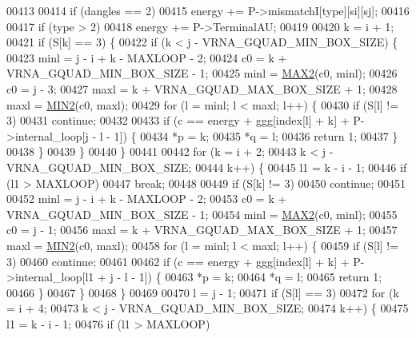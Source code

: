 \begin{DoxyCode}
00413 
00414   \textcolor{keywordflow}{if} (dangles == 2)
00415     energy += P->mismatchI[type][si][sj];
00416 
00417   \textcolor{keywordflow}{if} (type > 2)
00418     energy += P->TerminalAU;
00419 
00420   k = i + 1;
00421   \textcolor{keywordflow}{if} (S[k] == 3) \{
00422     \textcolor{keywordflow}{if} (k < j - VRNA\_GQUAD\_MIN\_BOX\_SIZE) \{
00423       minl  = j - i + k - MAXLOOP - 2;
00424       c0    = k + VRNA\_GQUAD\_MIN\_BOX\_SIZE - 1;
00425       minl  = \hyperlink{group__utils_ga33297b3679c713b0c4d897cd0fe3b122}{MAX2}(c0, minl);
00426       c0    = j - 3;
00427       maxl  = k + VRNA\_GQUAD\_MAX\_BOX\_SIZE + 1;
00428       maxl  = \hyperlink{group__utils_gae0b9cd0ce090bd69b951aa73e8fa4f7d}{MIN2}(c0, maxl);
00429       \textcolor{keywordflow}{for} (l = minl; l < maxl; l++) \{
00430         \textcolor{keywordflow}{if} (S[l] != 3)
00431           \textcolor{keywordflow}{continue};
00432 
00433         \textcolor{keywordflow}{if} (c == energy + ggg[index[l] + k] + P->internal\_loop[j - l - 1]) \{
00434           *p  = k;
00435           *q  = l;
00436           \textcolor{keywordflow}{return} 1;
00437         \}
00438       \}
00439     \}
00440   \}
00441 
00442   \textcolor{keywordflow}{for} (k = i + 2;
00443        k < j - VRNA\_GQUAD\_MIN\_BOX\_SIZE;
00444        k++) \{
00445     l1 = k - i - 1;
00446     \textcolor{keywordflow}{if} (l1 > MAXLOOP)
00447       \textcolor{keywordflow}{break};
00448 
00449     \textcolor{keywordflow}{if} (S[k] != 3)
00450       \textcolor{keywordflow}{continue};
00451 
00452     minl  = j - i + k - MAXLOOP - 2;
00453     c0    = k + VRNA\_GQUAD\_MIN\_BOX\_SIZE - 1;
00454     minl  = \hyperlink{group__utils_ga33297b3679c713b0c4d897cd0fe3b122}{MAX2}(c0, minl);
00455     c0    = j - 1;
00456     maxl  = k + VRNA\_GQUAD\_MAX\_BOX\_SIZE + 1;
00457     maxl  = \hyperlink{group__utils_gae0b9cd0ce090bd69b951aa73e8fa4f7d}{MIN2}(c0, maxl);
00458     \textcolor{keywordflow}{for} (l = minl; l < maxl; l++) \{
00459       \textcolor{keywordflow}{if} (S[l] != 3)
00460         \textcolor{keywordflow}{continue};
00461 
00462       \textcolor{keywordflow}{if} (c == energy + ggg[index[l] + k] + P->internal\_loop[l1 + j - l - 1]) \{
00463         *p  = k;
00464         *q  = l;
00465         \textcolor{keywordflow}{return} 1;
00466       \}
00467     \}
00468   \}
00469 
00470   l = j - 1;
00471   \textcolor{keywordflow}{if} (S[l] == 3)
00472     \textcolor{keywordflow}{for} (k = i + 4;
00473          k < j - VRNA\_GQUAD\_MIN\_BOX\_SIZE;
00474          k++) \{
00475       l1 = k - i - 1;
00476       \textcolor{keywordflow}{if} (l1 > MAXLOOP)

\end{DoxyCode}
